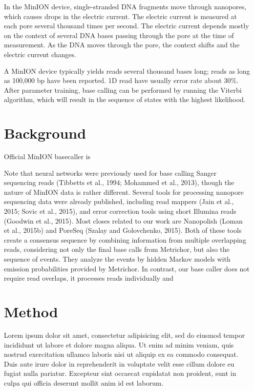 \documentclass[times, utf8, seminar]{fer}
\begin{document}
In the MinION device, single-stranded DNA fragments move through nanopores, which causes drops in the electric current. The electric current is measured at each pore several thousand times per second. The electric current depends mostly on the context of several DNA bases passing through the pore at the time of measurement. As the DNA moves through the pore, the context shifts and the electric current changes.

A MinION device typically yields reads several thousand bases long; reads as long as 100,000 bp have been reported. 1D read have usually error rate about   30\%. After parameter training, base calling can be performed by running the Viterbi algorithm, which will result in the sequence of states with the highest likelihood.

\chapter{Background}

Official MinION basecaller is

Note that neural networks were previously used for base calling Sanger sequencing reads (Tibbetts et al., 1994; Mohammed et al., 2013), though the nature of MinION data is rather different. Several tools for processing nanopore sequencing data were already published, including read mappers (Jain et al., 2015; Sovic et al., 2015), and error correction tools using short Illumina reads (Goodwin et al., 2015). Most closes related to our work are Nanopolish (Loman et al., 2015b) and PoreSeq (Szalay and Golovchenko, 2015). Both of these tools create a consensus sequence by combining information from multiple overlapping reads, considering not only the final base calls from Metrichor, but also the sequence of events. They analyze the events by hidden Markov models with emission probabilities provided by Metrichor. In contrast, our base caller does not require read overlaps, it processes reads individually and

\chapter{Method}

Lorem ipsum dolor sit amet, consectetur adipisicing elit, sed do eiusmod tempor incididunt ut labore et dolore magna aliqua. Ut enim ad minim veniam, quis nostrud exercitation ullamco laboris nisi ut aliquip ex ea commodo consequat. Duis aute irure dolor in reprehenderit in voluptate velit esse cillum dolore eu fugiat nulla pariatur. Excepteur sint occaecat cupidatat non proident, sunt in culpa qui officia deserunt mollit anim id est laborum.
\end{document}
